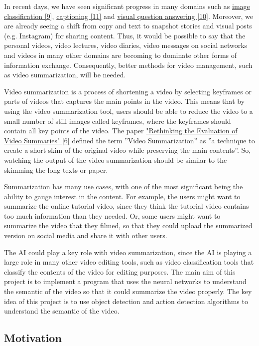 \documentclass{article}
\begin{document}
In recent days, we have seen significant progress in many domains such as \hyperlink{ref9}{image classification [9]}, \hyperlink{ref11}{captioning [11]} and \hyperlink{ref10}{visual question answering [10]}. Moreover, we are already seeing a shift from copy and text to snapshot stories and visual posts (e.g. Instagram) for sharing content. Thus, it would be possible to say that the personal videos, video lectures, video diaries, video messages on social networks and videos in many other domains are becoming to dominate other forms of information exchange. Consequently, better methods for video management, such as video summarization, will be needed. 

Video summarization is a process of shortening a video by selecting keyframes or parts of videos that captures the main points in the video. This means that by using the video summarization tool, users should be able to reduce the video to a small number of still images called keyframes, where the keyframes should contain all key points of the video. The paper \hyperlink{ref6}{"Rethinking the Evaluation of Video Summaries" [6]} defined the term ”Video Summarization” as ”a technique to create a short skim of the original video while preserving the main contents”. So, watching the output of the video summarization should be similar to the skimming the long texts or paper.

Summarization has many use cases, with one of the most significant being the ability to gauge interest in the content. For example, the users might want to summarize the online tutorial video, since they think the tutorial video contains too much information than they needed. Or, some users might want to summarize the video that they filmed, so that they could upload the summarized version on social media and share it with other users.

The AI could play a key role with video summarization, since the AI is playing a large role in many other video editing tools, such as video classification tools that classify the contents of the video for editing purposes. The main aim of this project is to implement a program that uses the neural networks to understand the semantic of the video so that it could summarize the video properly. The key idea of this project is to use object detection and action detection algorithms to understand the semantic of the video.


\subsection{Motivation}
\end{document}
